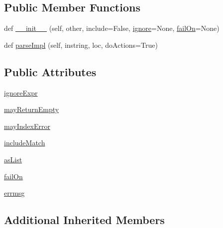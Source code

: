 \subsection*{Public Member Functions}
\begin{DoxyCompactItemize}
\item 
def \hyperlink{classsetuptools_1_1__vendor_1_1pyparsing_1_1SkipTo_a68b2183fe7c02ee31f00d63e3ed1b1f5}{\+\_\+\+\_\+init\+\_\+\+\_\+} (self, other, include=False, \hyperlink{classsetuptools_1_1__vendor_1_1pyparsing_1_1ParseElementEnhance_a875f69cc8c08a3e2d92242cd58fae173}{ignore}=None, \hyperlink{classsetuptools_1_1__vendor_1_1pyparsing_1_1SkipTo_ad631b250725091b5692bbad18f5bc237}{fail\+On}=None)
\item 
def \hyperlink{classsetuptools_1_1__vendor_1_1pyparsing_1_1SkipTo_af945a9301b2c1f76ea872410bfff218b}{parse\+Impl} (self, instring, loc, do\+Actions=True)
\end{DoxyCompactItemize}
\subsection*{Public Attributes}
\begin{DoxyCompactItemize}
\item 
\hyperlink{classsetuptools_1_1__vendor_1_1pyparsing_1_1SkipTo_af12f21cafc85f05ad1941e2e220e1d6a}{ignore\+Expr}
\item 
\hyperlink{classsetuptools_1_1__vendor_1_1pyparsing_1_1SkipTo_ace09988b780f04c038a1a34a493a6108}{may\+Return\+Empty}
\item 
\hyperlink{classsetuptools_1_1__vendor_1_1pyparsing_1_1SkipTo_a1890c7dc658056ba0f28cd319d6aa9ad}{may\+Index\+Error}
\item 
\hyperlink{classsetuptools_1_1__vendor_1_1pyparsing_1_1SkipTo_ade26777e0ed226ced1c5e3714a2562d4}{include\+Match}
\item 
\hyperlink{classsetuptools_1_1__vendor_1_1pyparsing_1_1SkipTo_a99bcc295ebd114a5bacfbe737ba98968}{as\+List}
\item 
\hyperlink{classsetuptools_1_1__vendor_1_1pyparsing_1_1SkipTo_ad631b250725091b5692bbad18f5bc237}{fail\+On}
\item 
\hyperlink{classsetuptools_1_1__vendor_1_1pyparsing_1_1SkipTo_aef2fafd0e069050ccbe01b7070791245}{errmsg}
\end{DoxyCompactItemize}
\subsection*{Additional Inherited Members}


